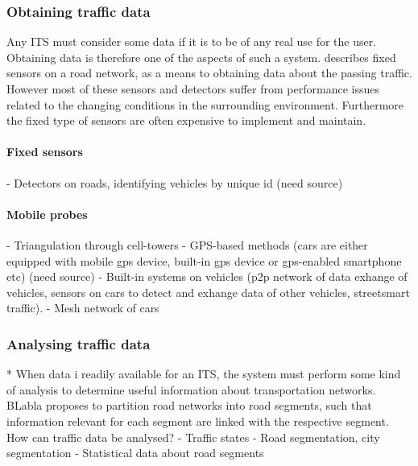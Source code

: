 \subsubsection*{Obtaining traffic data}
Any ITS must consider some data if it is to be of any real use for the user. Obtaining data is therefore one of the aspects of such a system. \citet{KamranHaas2007} describes fixed sensors on a road network, as a means to obtaining data about the passing traffic. However most of these sensors and detectors suffer from performance issues related to the changing conditions in the surrounding environment. Furthermore the fixed type of sensors are often expensive to implement and maintain\cite{KamranHaas2007}. %

\paragraph{Fixed sensors}
- Detectors on roads, identifying vehicles by unique id (need source)


\paragraph{Mobile probes}
- Triangulation through cell-towers
- GPS-based methods (cars are either equipped with mobile gps device, built-in gps device or gps-enabled smartphone etc) (need source)
- Built-in systems on vehicles (p2p network of data exhange of vehicles, sensors on cars to detect and exhange data of other vehicles, streetsmart traffic).
- Mesh network of cars

\subsubsection*{Analysing traffic data}*
When data i readily available for an ITS, the system must perform some kind of analysis to determine useful information about transportation networks. BLabla proposes to partition road networks into road segments, such that information relevant for each segment are linked with the respective segment. 
How can traffic data be analysed?
- Traffic states
- Road segmentation, city segmentation
- Statistical data about road segments 